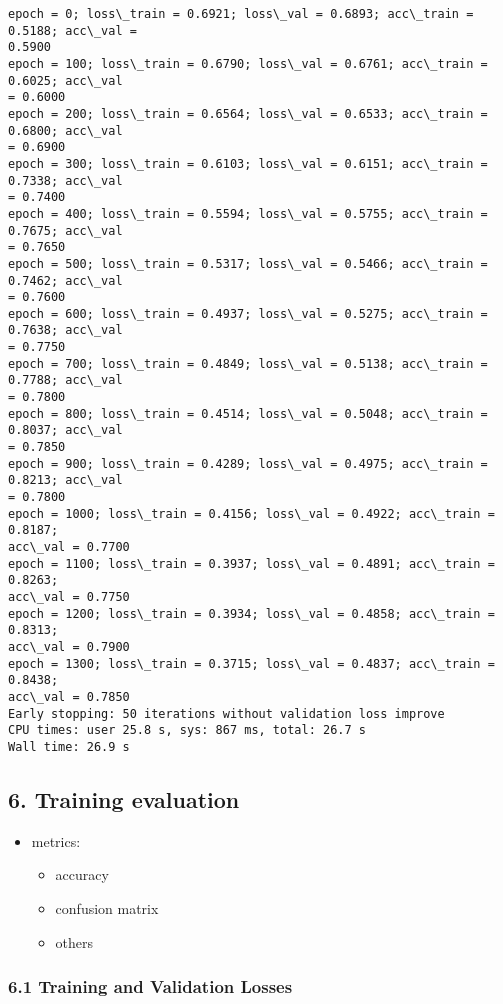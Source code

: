 \documentclass[10pt]{article}
\providecommand{\tightlist}{%
      \setlength{\itemsep}{0pt}\setlength{\parskip}{0pt}}
\begin{document}
    \begin{Verbatim}[commandchars=\\\{\}]
epoch = 0; loss\_train = 0.6921; loss\_val = 0.6893; acc\_train = 0.5188; acc\_val =
0.5900
epoch = 100; loss\_train = 0.6790; loss\_val = 0.6761; acc\_train = 0.6025; acc\_val
= 0.6000
epoch = 200; loss\_train = 0.6564; loss\_val = 0.6533; acc\_train = 0.6800; acc\_val
= 0.6900
epoch = 300; loss\_train = 0.6103; loss\_val = 0.6151; acc\_train = 0.7338; acc\_val
= 0.7400
epoch = 400; loss\_train = 0.5594; loss\_val = 0.5755; acc\_train = 0.7675; acc\_val
= 0.7650
epoch = 500; loss\_train = 0.5317; loss\_val = 0.5466; acc\_train = 0.7462; acc\_val
= 0.7600
epoch = 600; loss\_train = 0.4937; loss\_val = 0.5275; acc\_train = 0.7638; acc\_val
= 0.7750
epoch = 700; loss\_train = 0.4849; loss\_val = 0.5138; acc\_train = 0.7788; acc\_val
= 0.7800
epoch = 800; loss\_train = 0.4514; loss\_val = 0.5048; acc\_train = 0.8037; acc\_val
= 0.7850
epoch = 900; loss\_train = 0.4289; loss\_val = 0.4975; acc\_train = 0.8213; acc\_val
= 0.7800
epoch = 1000; loss\_train = 0.4156; loss\_val = 0.4922; acc\_train = 0.8187;
acc\_val = 0.7700
epoch = 1100; loss\_train = 0.3937; loss\_val = 0.4891; acc\_train = 0.8263;
acc\_val = 0.7750
epoch = 1200; loss\_train = 0.3934; loss\_val = 0.4858; acc\_train = 0.8313;
acc\_val = 0.7900
epoch = 1300; loss\_train = 0.3715; loss\_val = 0.4837; acc\_train = 0.8438;
acc\_val = 0.7850
Early stopping: 50 iterations without validation loss improve
CPU times: user 25.8 s, sys: 867 ms, total: 26.7 s
Wall time: 26.9 s
    \end{Verbatim}

    \hypertarget{training-evaluation}{%
\subsection{6. Training evaluation}\label{training-evaluation}}

\begin{itemize}
\tightlist
\item
  metrics:

  \begin{itemize}
  \tightlist
  \item
    accuracy
  \item
    confusion matrix
  \item
    others
  \end{itemize}
\end{itemize}

    \hypertarget{training-and-validation-losses}{%
\subsubsection{6.1 Training and Validation
Losses}\label{training-and-validation-losses}}
\end{document}
